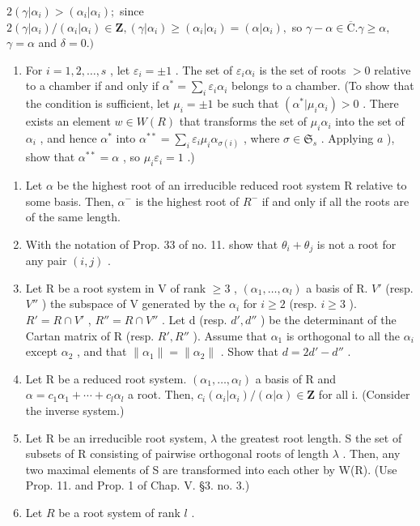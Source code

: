 \(2(\gamma|\alpha_{i})>(\alpha_{i}|\alpha_{i});\) since \(2(\gamma|\alpha_{i}) / (\alpha_{i}|\alpha_{i})\in \mathbf{Z},(\gamma |\alpha_{i})\geqslant (\alpha_{i}|\alpha_{i}) = (\alpha |\alpha_{i}),\) so \(\gamma -\alpha \in \overline{\mathrm{C}}. \gamma \geqslant \alpha ,\) \(\gamma = \alpha\) and \(\delta = 0.)\)

\begin{enumerate}
\def\labelenumi{\alph{enumi})}
\setcounter{enumi}{1}
\tightlist
\item
  For \(i = 1,2,\ldots,s\) , let \(\varepsilon_{i} = \pm 1\) . The set of \(\varepsilon_{i}\alpha_{i}\) is the set of roots \(>0\) relative to a chamber if and only if \(\alpha^{*} = \sum_{i}\varepsilon_{i}\alpha_{i}\) belongs to a chamber. (To show that the condition is sufficient, let \(\mu_{i} = \pm 1\) be such that \((\alpha^{*}|\mu_{i}\alpha_{i}) > 0\) . There exists an element \(w\in W(R)\) that transforms the set of \(\mu_{i}\alpha_{i}\) into the set of \(\alpha_{i}\) , and hence \(\alpha^{*}\) into \(\alpha^{**} = \sum_{i}\varepsilon_{i}\mu_{i}\alpha_{\sigma(i)}\) , where \(\sigma \in \mathfrak{S}_s\) . Applying \(a\) ), show that \(\alpha^{**} = \alpha\) , so \(\mu_{i}\varepsilon_{i} = 1\) .)
\end{enumerate}

\begin{enumerate}
\def\labelenumi{\arabic{enumi})}
\setcounter{enumi}{9}
\item
  Let \(\alpha\) be the highest root of an irreducible reduced root system R relative to some basis. Then, \(\alpha^{-}\) is the highest root of \(R^{-}\) if and only if all the roots are of the same length.
\item
  With the notation of Prop. 33 of no. 11. show that \(\theta_{i} + \theta_{j}\) is not a root for any pair \((i,j)\) .
\item
  Let R be a root system in V of rank \(\geqslant 3\) , \((\alpha_{1},\ldots,\alpha_{l})\) a basis of R. \(V'\) (resp. \(V''\) ) the subspace of V generated by the \(\alpha_{i}\) for \(i \geqslant 2\) (resp. \(i \geqslant 3\) ). \(R' = R \cap V'\) , \(R'' = R \cap V''\) . Let d (resp. \(d', d''\) ) be the determinant of the Cartan matrix of R (resp. \(R', R''\) ). Assume that \(\alpha_{1}\) is orthogonal to all the \(\alpha_{i}\) except \(\alpha_{2}\) , and that \(\| \alpha_{1} \| = \| \alpha_{2} \|\) . Show that \(d = 2d' - d''\) .
\item
  Let R be a reduced root system. \((\alpha_{1},\ldots,\alpha_{l})\) a basis of R and \(\alpha=c_{1}\alpha_{1}+\cdots+c_{l}\alpha_{l}\) a root. Then, \(c_{i}(\alpha_{i}|\alpha_{i})/(\alpha|\alpha)\in\mathbf{Z}\) for all i. (Consider the inverse system.)
\item
  Let R be an irreducible root system, \(\lambda\) the greatest root length. S the set of subsets of R consisting of pairwise orthogonal roots of length \(\lambda\) . Then, any two maximal elements of S are transformed into each other by W(R). (Use Prop. 11. and Prop. 1 of Chap. V. §3. no. 3.)
\item
  Let \(R\) be a root system of rank \(l\) .
\end{enumerate}

